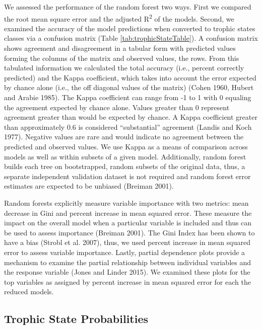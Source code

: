 \documentclass[12pt,]{article}
\begin{document}
We assessed the performance of the random forest two ways. First we
compared the root mean square error and the adjusted
R\textsuperscript{2} of the models. Second, we examined the accuracy of
the model predictions when converted to trophic states classes via a
confusion matrix (Table \ref{tab:trophicStateTable}). A confusion matrix
shows agreement and disagreement in a tabular form with predicted values
forming the columns of the matrix and observed values, the rows. From
this tabulated information we calculated the total accuracy (i.e.,
percent correctly predicted) and the Kappa coefficient, which takes into
account the error expected by chance alone (i.e., the off diagonal
values of the matrix) (Cohen 1960, Hubert and Arabie 1985). The Kappa
coefficient can range from -1 to 1 with 0 equaling the agreement
expected by chance alone. Values greater than 0 represent agreement
greater than would be expected by chance. A Kappa coefficient greater
than approximately 0.6 is considered ``substantial'' agreement (Landis
and Koch 1977). Negative values are rare and would indicate no agreement
between the predicted and observed values. We use Kappa as a means of
comparison across models as well as within subsets of a given model.
Additionally, random forest builds each tree on bootstrapped, random
subsets of the original data, thus, a separate independent validation
dataset is not required and random forest error estimates are expected
to be unbiased (Breiman 2001).

Random forests explicitly measure variable importance with two metrics:
mean decrease in Gini and percent increase in mean squared error. These
measure the impact on the overall model when a particular variable is
included and thus can be used to assess importance (Breiman 2001). The
Gini Index has been shown to have a bias (Strobl et al. 2007), thus, we
used percent increase in mean squared error to assess variable
importance. Lastly, partial dependence plots provide a mechanism to
examine the partial relationship between individual variables and the
response variable (Jones and Linder 2015). We examined these plots for
the top variables as assigned by percent increase in mean squared error
for each the reduced models.

\subsection{Trophic State
Probabilities}\label{trophic-state-probabilities}
\end{document}
